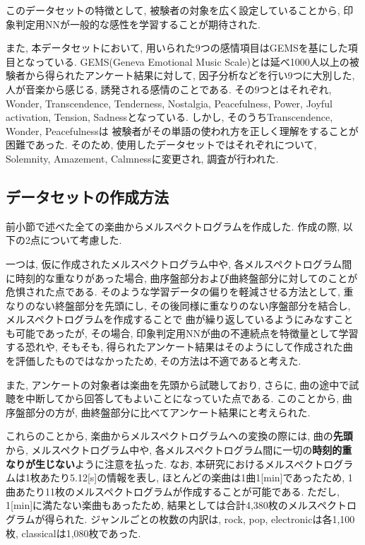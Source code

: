 \documentclass[a4paper,11pt,dvipdfmx]{jreport}
\begin{document}
このデータセットの特徴として, 被験者の対象を広く設定していることから, 印象判定用NNが一般的な感性を学習することが期待された.

また, 本データセットにおいて, 用いられた9つの感情項目はGEMSを基にした項目となっている.
GEMS(Geneva Emotional Music Scale)\cite{GEMS}とは延べ1000人以上の被験者から得られたアンケート結果に対して, 
因子分析などを行い9つに大別した, 人が音楽から感じる, 誘発される感情のことである.
その9つとはそれぞれ, Wonder, Transcendence, Tenderness, Nostalgia, Peacefulness, Power, 
Joyful activation, Tension, Sadnessとなっている. 
しかし, そのうちTranscendence, Wonder, Peacefulnessは
被験者がその単語の使われ方を正しく理解をすることが困難であった.
そのため, 使用したデータセットではそれぞれについて, Solemnity, Amazement, Calmnessに変更され, 調査が行われた.

\subsection{データセットの作成方法}
前小節で述べた全ての楽曲からメルスペクトログラムを作成した.
作成の際, 以下の2点について考慮した.

一つは, 仮に作成されたメルスペクトログラム中や, 各メルスペクトログラム間に時刻的な重なりがあった場合, 
曲序盤部分および曲終盤部分に対してのことが危惧された点である.
そのような学習データの偏りを軽減させる方法として, 
重なりのない終盤部分を先頭にし, その後同様に重なりのない序盤部分を結合し, メルスペクトログラムを作成することで
曲が繰り返しているようにみなすことも可能であったが, その場合, 印象判定用NNが曲の不連続点を特徴量として学習する恐れや, 
そもそも, 得られたアンケート結果はそのようにして作成された曲を評価したものではなかったため, その方法は不適であると考えた.

また, アンケートの対象者は楽曲を先頭から試聴しており, さらに, 曲の途中で試聴を中断してから回答してもよいことになっていた点である.
このことから, 曲序盤部分の方が, 曲終盤部分に比べてアンケート結果にと考えられた.

これらのことから, 楽曲からメルスペクトログラムへの変換の際には, 
曲の\textbf{先頭}から, メルスペクトログラム中や, 各メルスペクトログラム間に一切の\textbf{時刻的重なりが生じない}ように注意を払った.
なお, 本研究におけるメルスペクトログラムは1枚あたり5.12[s]の情報を表し, ほとんどの楽曲は1曲1[min]であったため,
1曲あたり11枚のメルスペクトログラムが作成することが可能である.
ただし, 1[min]に満たない楽曲もあったため, 結果としては合計4,380枚のメルスペクトログラムが得られた.
ジャンルごとの枚数の内訳は, rock, pop, electronicは各1,100枚, classicalは1,080枚であった.
\end{document}
